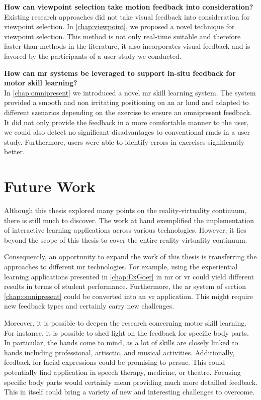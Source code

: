 \textbf{How can viewpoint selection take motion feedback into consideration?}\\
Existing research approaches did not take visual feedback into consideration for viewpoint selection.
In \autoref{chap:viewpoint}, we proposed a novel technique for viewpoint selection.
This method is not only real-time suitable and therefore faster than methods in the literature, it also incorporates visual feedback and is favored by the participants of a user study we conducted.

\textbf{How can \acrlong{mr} systems be leveraged to support in-situ feedback for motor skill learning?}\\
In \autoref{chap:omnipresent} we introduced a novel \acrshort{mr} skill learning system.
The system provided a smooth and non irritating positioning on an \acrshort{ar} \acrshort{hmd} and adapted to different szenarios depending on the exercise to ensure an omnipresent feedback.
It did not only provide the feedback in a more comfortable manner to the user, we could also detect no significant disadvantages to conventional \acrshort{rmd}s in a user study.
Furthermore, users were able to identify errors in exercises significantly better.

\section{Future Work}
\label{sec:conclusion:future}

Although this thesis explored many points on the reality-virtuality continuum, there is still much to discover.
The work at hand exemplified the implementation of interactive learning applications across various technologies.
However, it lies beyond the scope of this thesis to cover the entire reality-virtuality continuum.

Consequently, an opportunity to expand the work of this thesis is transferring the approaches to different \acrshort{mr} technologies.
For example, using the experiential learning applications presented in \autoref{chap:ExGoer} in \acrshort{mr} or \acrshort{vr} could yield different results in terms of student performance.
Furthermore, the \acrshort{ar} system of section \autoref{chap:omnipresent} could be converted into an \acrshort{vr} application.
This might require new feedback types and certainly carry new challenges.

Moreover, it is possible to deepen the research concerning motor skill learning.
For instance, it is possible to shed light on the feedback for specific body parts.
In particular, the hands come to mind, as a lot of skills are closely linked to hands including professional, artisctic, and musical activities.
Additionally, feedback for facial expressions could be promising to persue.
This could potentially find application in speech therapy, medicine, or theatre.
Focusing specific body parts would certainly mean providing much more detailled feedback.
This in itself could bring a variety of new and interesting challenges to overcome.

